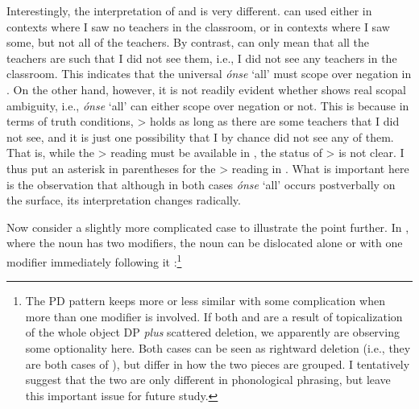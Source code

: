 \documentclass[output=paper,colorlinks,citecolor=brown
]{langscibook}
\begin{document}
 Interestingly, the interpretation of  and  is very different.  can used either in contexts where I saw no teachers in the classroom, or in contexts where I saw some, but not all of the teachers. By contrast,  can only mean that all the teachers are such that I did not see them, i.e., I did not see any teachers in the classroom. This indicates that the universal \textit{\'{o}nse} `all' must scope over negation in . On the other hand, however, it is not readily evident whether  shows real scopal ambiguity, i.e., \textit{\'{o}nse} `all' can either scope over negation or not. This is because in terms of truth conditions, \neg>\forall {} holds as long as there are some teachers that I did not see, and it is just one possibility that I by chance did not see any of them. That is, while the \neg>\forall {} reading must be available in , the status of \forall>\neg {} is not clear. I thus put an asterisk in parentheses for the \forall>\neg {} reading in . What is important here is the observation that although in both cases \textit{\'{o}nse} `all' occurs postverbally on the surface, its interpretation changes radically.

Now consider a slightly more complicated case to illustrate the point further. In , where the noun has two modifiers, the noun can be dislocated alone  or with one modifier immediately following it :\footnote{The PD pattern keeps more or less similar with some complication when more than one modifier is involved. If both  and  are a result of topicalization of the whole object DP \textit{plus} scattered deletion, we apparently are observing some optionality here. Both cases can be seen as rightward deletion (i.e., they are both cases of ), but differ in how the two pieces are grouped. I tentatively suggest that the two are only different in phonological phrasing, but leave this important issue for future study.}
\end{document}
